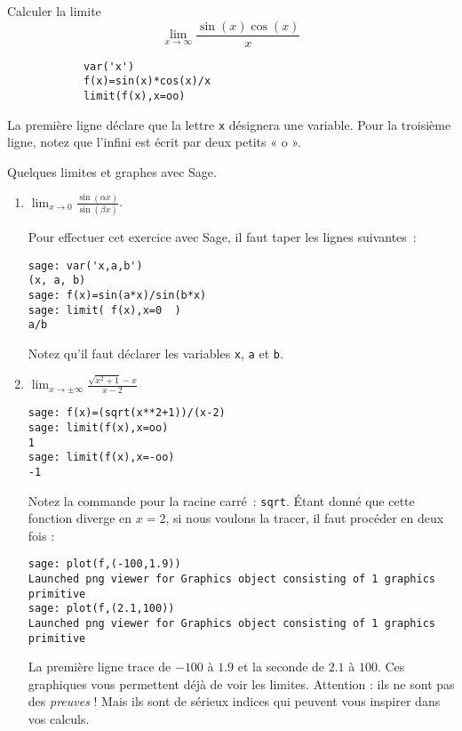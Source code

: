 

\begin{example}     \label{ExBCRXooDVUdcf}
	Calculer la limite
	\begin{equation}
		\lim_{x\to\infty}\frac{ \sin(x)\cos(x) }{ x }
	\end{equation}


	\begin{verbatim}
			var('x')
			f(x)=sin(x)*cos(x)/x
			limit(f(x),x=oo)
            \end{verbatim}
	La première ligne déclare que la lettre \texttt{x} désignera une variable. Pour la troisième ligne, notez que l'infini est écrit par deux petits « o ».
\end{example}

\begin{example}     \label{ExCWDRooKxnjGL}
	Quelques limites et graphes avec Sage.

	\begin{enumerate}

		\item
		      \( \lim_{x\to 0} \frac{ \sin(\alpha x) }{ \sin(\beta x) }\).

		      Pour effectuer cet exercice avec Sage, il faut taper les lignes suivantes~:


		      \begin{verbatim}
sage: var('x,a,b')
(x, a, b)
sage: f(x)=sin(a*x)/sin(b*x)
sage: limit( f(x),x=0  )
a/b
\end{verbatim}

		      Notez qu'il faut déclarer les variables \texttt{x}, \texttt{a} et \texttt{b}.

		\item
		      \( \lim_{x\to \pm\infty} \frac{ \sqrt{x^2+1}-x }{ x-2 }\)

		      \begin{verbatim}
sage: f(x)=(sqrt(x**2+1))/(x-2)
sage: limit(f(x),x=oo)
1
sage: limit(f(x),x=-oo)
-1
            \end{verbatim}

		      Notez la commande pour la racine carré~: \texttt{sqrt}. Étant donné que cette fonction diverge en \( x=2\), si nous voulons la tracer, il faut procéder en deux fois :

		      \begin{verbatim}
sage: plot(f,(-100,1.9))
Launched png viewer for Graphics object consisting of 1 graphics primitive
sage: plot(f,(2.1,100))
Launched png viewer for Graphics object consisting of 1 graphics primitive
            \end{verbatim}
		      La première ligne trace de \( -100\) à \( 1.9\) et la seconde de \( 2.1\) à \( 100\). Ces graphiques vous permettent déjà de voir les limites. Attention : ils ne sont pas des \emph{preuves} ! Mais ils sont de sérieux indices qui peuvent vous inspirer dans vos calculs.

	\end{enumerate}
\end{example}


